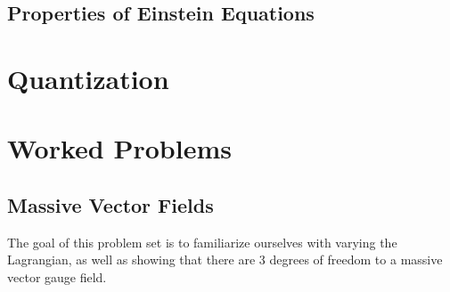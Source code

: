 \documentclass[a4paper,11pt]{article}
\numberwithin{equation}{section}
\theoremstyle{definition}
\begin{document}
\subsection{Properties of Einstein Equations}

\newpage



\section{Quantization}

\newpage












































\section{Worked Problems}

\subsection{Massive Vector Fields}
The goal of this problem set is to familiarize ourselves with varying the Lagrangian, as well as showing that there are 3 degrees of freedom to a massive vector gauge field. \\
\end{document}
